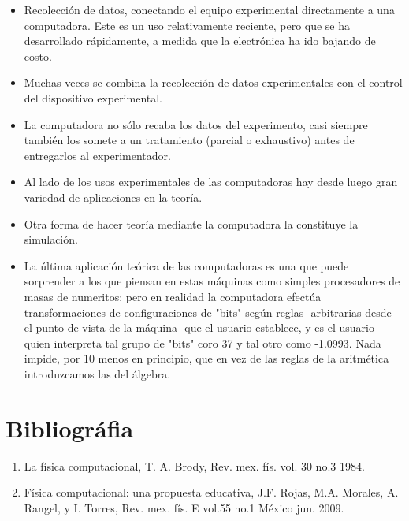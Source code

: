 \documentclass[12pt,a4paper]{article}
\begin{document}
\begin{itemize}
	\item Recolección de datos, conectando el equipo experimental directamente a
una computadora. Este es un uso relativamente reciente, pero que se ha desarrollado rápidamente, a medida que la electrónica ha ido bajando de costo.
	\item Muchas veces se combina la recolección de datos experimentales con el
control del dispositivo experimental.
	\item La computadora no sólo recaba los datos del experimento, casi siempre
también los somete a un tratamiento (parcial o exhaustivo) antes de entregarlos al experimentador.
	\item Al lado de los usos experimentales de las computadoras hay desde luego
gran variedad de aplicaciones en la teoría.
	\item Otra forma de hacer teoría mediante la computadora la constituye la simulación.
	\item La última aplicación teórica de las computadoras es una que puede sorprender a los que piensan en estas máquinas como simples procesadores de masas de numeritos: pero en realidad la computadora efectúa transformaciones de configuraciones de "bits" según reglas -arbitrarias desde el punto de vista de la máquina- que el usuario establece, y es el usuario quien interpreta tal grupo de "bits" coro 37 y tal otro como -1.0993. Nada impide, por 10 menos en principio, que en vez de las reglas de la aritmética introduzcamos las del álgebra.
\end{itemize}
\section*{Bibliográfia}
\begin{enumerate}
	\item La física computacional, T. A. Brody, Rev. mex. fís. vol. 30 no.3 1984.
	\item Física computacional: una propuesta educativa, J.F. Rojas, M.A. Morales, A. Rangel, y I. Torres, Rev. mex. fís. E vol.55 no.1 México jun. 2009.
\end{enumerate}
\end{document}
